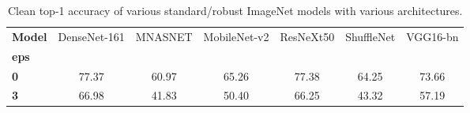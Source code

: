 \begin{table}
\centering
\caption{Clean top-1 accuracy of various standard/robust ImageNet models with various architectures.}
\label{app:imagenet-vary-arch-accuracies}
\begin{tabular}{l|c|c|c|c|c|c}
\toprule
\textbf{Model} &  DenseNet-161 &  MNASNET &  MobileNet-v2 &  ResNeXt50 &  ShuffleNet &  VGG16-bn \\
\textbf{eps} &               &          &               &            &             &           \\
\midrule
\textbf{0  } &         77.37 &    60.97 &         65.26 &      77.38 &       64.25 &     73.66 \\
\textbf{3  } &         66.98 &    41.83 &         50.40 &      66.25 &       43.32 &     57.19 \\
\bottomrule
\end{tabular}
\end{table}
